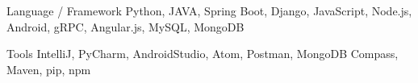 


\begin{cvskills}


\cvskill
{Language / Framework} %
{Python, JAVA, Spring Boot, Django, JavaScript, Node.js, Android, gRPC, Angular.js, MySQL, MongoDB} %


\cvskill
{Tools} %
{IntelliJ, PyCharm, AndroidStudio, Atom, Postman, MongoDB Compass, Maven, pip, npm} %



\end{cvskills}
